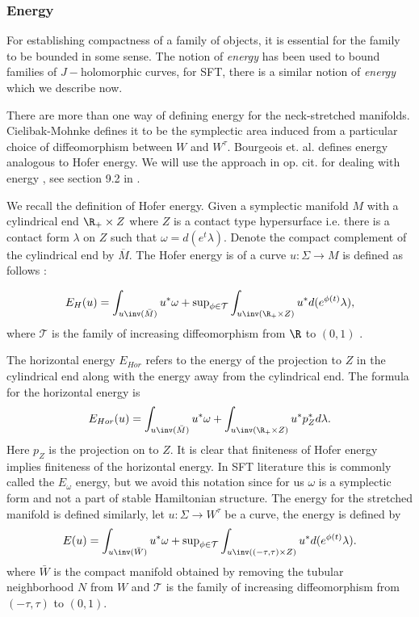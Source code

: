\subsubsection{ Energy}
For establishing compactness of a family of objects, it is essential for the family to be bounded in some sense.  The notion of \textit{energy} has been used to bound families of $J-$holomorphic curves, for SFT, there is a similar notion of \textit{energy} which we describe now. 

There are more than one way of defining energy for the neck-stretched manifolds. Cielibak-Mohnke \cite{ciel} defines it to be the symplectic area induced from a particular choice of diffeomorphism between $W$ and $W^\tau.$  
Bourgeois et. al. \cite{bhewz} defines energy  analogous to Hofer energy. We will use the approach in op. cit. for dealing with energy , see section 9.2 in \cite{bhewz}.

We recall the definition of Hofer energy. Given a symplectic manifold $M$ with a cylindrical end $\R_+ \times Z$ where $Z$ is a contact type hypersurface i.e. there is a contact form $\lambda$ on $Z$ such that $\omega=d(e^t\lambda)$.  Denote the compact complement of the cylindrical end by $\overline{M}$. The Hofer energy is of a curve $u:\Sigma \to M$  is defined as follows : 

$$E_H(u) = \int_{u\inv (\bar{M})} u^* \omega   + \text{sup}_{\phi \in \mathcal{T}} \int_{u\inv (\R_+ \times Z)} u^* d(e^{\phi(t)} \lambda),  $$
where $\mathcal{T}$ is the family of increasing diffeomorphism from $\R$ to $(0,1)$ .

The horizontal energy $E_{Hor}$ refers to the energy of the projection to $Z$ in the cylindrical end along with the energy away from the cylindrical end. The formula for  the horizontal energy is  $$E_{Hor}(u) = \int_{u\inv (\bar{M})} u^* \omega   +  \int_{u\inv (\R_+ \times Z)} u^* p_Z^* d \lambda .$$ Here $p_Z$ is the projection on to $Z$. It is clear that  finiteness of Hofer energy implies finiteness of the horizontal energy. In SFT literature this is commonly called the  $E_\omega$ energy, but we avoid this notation since for us $\omega$ is a symplectic form and not a part of stable Hamiltonian structure. The energy for the stretched manifold is defined similarly, let $u:\Sigma \to W^\tau$ be a curve, the energy is defined by $$E(u) =  \int_{u\inv (\bar{W})} u^* \omega   + \text{sup}_{\phi \in \mathcal{T}} \int_{u\inv ((-\tau,\tau) \times Z)} u^* d(e^{\phi(t)} \lambda) .$$
where $\bar{W}$ is the compact manifold obtained by removing the tubular neighborhood $N$ from $W$ and  $\mathcal{T}$ is the family of increasing diffeomorphism from $(-\tau,\tau)$ to $(0,1)$.



